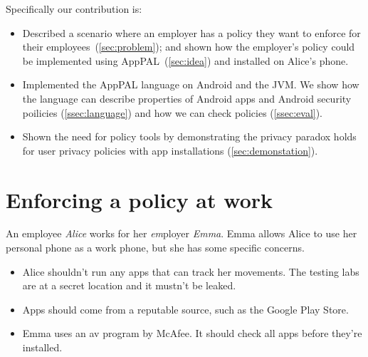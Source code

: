 \documentclass[]{llncs}
\begin{document}

\noindent
Specifically our contribution is:
\begin{itemize}
  \item
    Described a scenario where an employer has a policy they want to enforce for their employees~(\autoref{sec:problem});
    and shown how the employer's policy could be implemented using AppPAL~(\autoref{sec:idea}) and installed on Alice's phone.

  \item Implemented the AppPAL language on Android and the JVM.
    We show how the language can describe properties of Android apps and Android security poilicies (\autoref{ssec:language}) and how we can check policies (\autoref{ssec:eval}).

  \item Shown the need for policy tools by demonstrating the privacy paradox holds for user privacy policies with app installations (\autoref{sec:demonstation}).
\end{itemize}

\section{Enforcing a policy at work}
\label{sec:problem}

An employee \emph{Alice} works for her \emph{em\/}ployer \emph{Emma}.
Emma allows Alice to use her personal phone as a work phone, but she has some specific concerns.
\begin{itemize}
  \item Alice shouldn't run any apps that can track her movements.
    The testing labs are at a secret location and it mustn't be leaked.
  \item Apps should come from a reputable source, such as the Google Play Store.
  \item Emma uses an \ac{av} program by McAfee.
    It should check all apps before they're installed.
\end{itemize}
\end{document}
